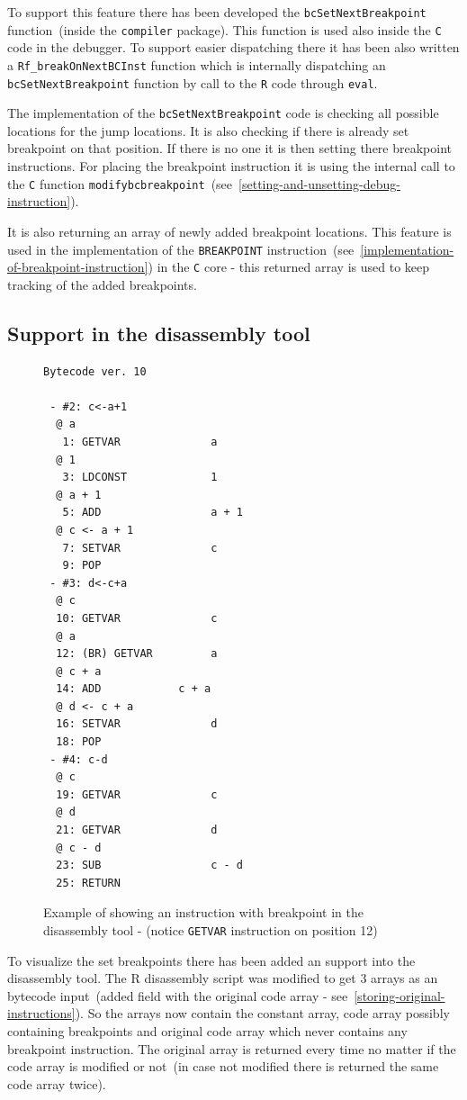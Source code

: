 \documentclass[thesis=M,english]{FITthesis}[2018/10/20]
\newcommand{\code}[1]{\texttt{#1}}
\begin{document}
To support this feature there has been developed the \code{bcSetNextBreakpoint} function~(inside the \code{compiler} package). This function is used also inside the  \code{C} code in the debugger. To support easier dispatching there it has been also written a \code{Rf{\_}breakOnNextBCInst} function which is internally dispatching an \code{bcSetNextBreakpoint} function by call to the \code{R} code through \code{eval}.

The implementation of the \code{bcSetNextBreakpoint} code is checking all possible locations for the jump locations. It is also checking if there is already set breakpoint on that position. If there is no one it is then setting there breakpoint instructions. For placing the breakpoint instruction it is using the internal call to the \code{C} function \code{modifybcbreakpoint}~(see~\ref{setting-and-unsetting-debug-instruction}).

It is also returning an array of newly added breakpoint locations. This feature is used in the implementation of the \code{BREAKPOINT} instruction~(see~\ref{implementation-of-breakpoint-instruction}) in the \code{C} core - this returned array is used to keep tracking of the added breakpoints.

\subsection{Support in the disassembly tool}\label{debugger-support-in-disassembly}

\begin{figure}[h]
\begin{lstlisting}
Bytecode ver. 10

 - #2: c<-a+1
  @ a
   1: GETVAR              a
  @ 1
   3: LDCONST             1
  @ a + 1
   5: ADD                 a + 1
  @ c <- a + 1
   7: SETVAR              c
   9: POP                 
 - #3: d<-c+a
  @ c
  10: GETVAR              c
  @ a
  12: (BR) GETVAR         a
  @ c + a
  14: ADD            c + a
  @ d <- c + a
  16: SETVAR              d
  18: POP                 
 - #4: c-d
  @ c
  19: GETVAR              c
  @ d
  21: GETVAR              d
  @ c - d
  23: SUB                 c - d
  25: RETURN 
\end{lstlisting}
	\caption{Example of showing an instruction with breakpoint in the disassembly tool - (notice \code{GETVAR} instruction on position 12)}\label{fig:breakpoints-in-disassembly-example}
\end{figure}


To visualize the set breakpoints there has been added an support into the disassembly tool. The R disassembly script was modified to get 3 arrays as an bytecode input~(added field with the original code array - see~\ref{storing-original-instructions}). So the arrays now contain the constant array, code array possibly containing breakpoints and original code array which never contains any breakpoint instruction. The original array is returned every time no matter if the code array is modified or not~(in case not modified there is returned the same code array twice). 
\end{document}
